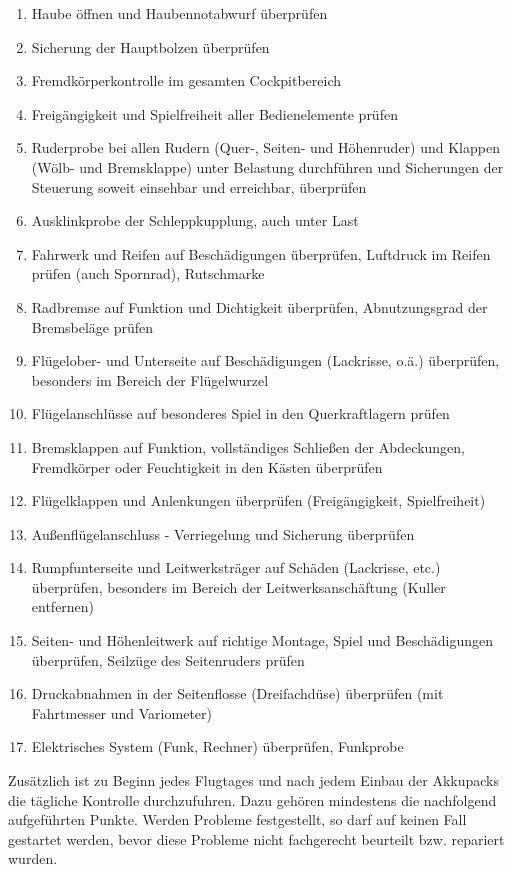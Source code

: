 \begin{enumerate}
\item Haube öffnen und Haubennotabwurf überprüfen
\item Sicherung der Hauptbolzen überprüfen
\item Fremdkörperkontrolle im gesamten Cockpitbereich
\item Freigängigkeit und Spielfreiheit aller Bedienelemente prüfen
\item Ruderprobe bei allen Rudern (Quer-, Seiten- und Höhenruder) und Klappen (Wölb- und Bremsklappe) unter Belastung durchführen und Sicherungen der Steuerung soweit einsehbar und erreichbar, überprüfen
\item Ausklinkprobe der Schleppkupplung, auch unter Last
\item Fahrwerk und Reifen auf Beschädigungen überprüfen, Luftdruck im Reifen prüfen (auch Spornrad), Rutschmarke
\item Radbremse auf Funktion und Dichtigkeit überprüfen, Abnutzungsgrad der Bremsbeläge prüfen
\item Flügelober- und Unterseite auf Beschädigungen (Lackrisse, o.ä.) überprüfen, besonders im Bereich der Flügelwurzel
\item Flügelanschlüsse auf besonderes Spiel in den Querkraftlagern prüfen
\item Bremsklappen auf Funktion, vollständiges Schließen der Abdeckungen, Fremdkörper oder Feuchtigkeit in den Kästen überprüfen
\item Flügelklappen und Anlenkungen überprüfen (Freigängigkeit, Spielfreiheit)
\item Außenflügelanschluss - Verriegelung und Sicherung überprüfen
\item Rumpfunterseite und Leitwerksträger auf Schäden (Lackrisse, etc.) 	überprüfen, besonders im Bereich der Leitwerksanschäftung (Kuller entfernen)
\item Seiten- und Höhenleitwerk auf richtige Montage, Spiel und Beschädigungen 	überprüfen, Seilzüge des Seitenruders prüfen
\item Druckabnahmen in der Seitenflosse (Dreifachdüse) überprüfen (mit 	Fahrtmesser und Variometer)
\item Elektrisches System (Funk, Rechner) überprüfen, 	Funkprobe
\end{enumerate}

Zusätzlich ist zu Beginn jedes Flugtages und nach jedem Einbau der Akkupacks die tägliche
Kontrolle durchzufuhren. Dazu gehören mindestens die nachfolgend aufgeführten Punkte.
Werden Probleme festgestellt, so darf auf keinen Fall gestartet werden, bevor diese
Probleme nicht fachgerecht beurteilt bzw. repariert wurden.

